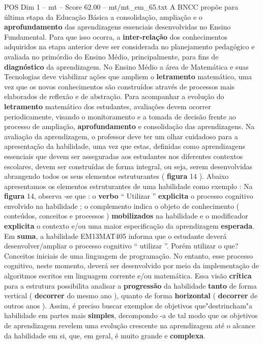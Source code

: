 \begin{textsample}{POS Dim 1 – mt – Score 62.00 – mt/mt\_em\_65.txt}
A BNCC propõe para última etapa da Educação Básica a consolidação, ampliação e o \textbf{aprofundamento} das aprendizagens essenciais desenvolvidas no Ensino Fundamental.
Para que isso ocorra, a \textbf{inter-relação} dos conhecimentos adquiridos na etapa anterior deve ser considerada no planejamento pedagógico e avaliada no primórdio do Ensino Médio, principalmente, para fins de \textbf{diagnóstico} da aprendizagem.
No Ensino Médio a área de Matemática e suas Tecnologias deve viabilizar ações que ampliem o \textbf{letramento} matemático, uma vez que os novos conhecimentos são construídos através de processos mais elaborados de reflexão e de abstração.
Para acompanhar a evolução do \textbf{letramento} matemático dos estudantes, avaliações devem ocorrer periodicamente, visando o monitoramento e a tomada de decisão frente ao processo de ampliação, \textbf{aprofundamento} e consolidação das aprendizagens.
Na avaliação da aprendizagem, o professor deve ter um olhar cuidadoso para a apresentação da habilidade, uma vez que estas, definidas como aprendizagens essenciais que devem ser asseguradas aos estudantes nos diferentes contextos escolares, devem ser construídas de forma integral, ou seja, serem desenvolvidas abrangendo todos os seus elementos estruturantes ( \textbf{figura} 14 ).
Abaixo apresentamos os elementos estruturantes de uma habilidade como exemplo : Na \textbf{figura} 14, observa -se que : o \textbf{verbo} “ Utilizar ” \textbf{explicita} o processo cognitivo envolvido na habilidade ; o complemento indica o objeto de conhecimento ( conteúdos, conceitos e processos ) \textbf{mobilizados} na habilidade e o modificador \textbf{explicita} o contexto e/ou uma maior especificação da aprendizagem \textbf{esperada}.
Em \textbf{suma}, a habilidade EM13MAT405 informa que o estudante deverá desenvolver/ampliar o processo cognitivo “ utilizar ”.
Porém utilizar o que?
Conceitos iniciais de uma linguagem de programação.
No entanto, esse processo cognitivo, neste momento, deverá ser desenvolvido por meio da implementação de algoritmos escritos em linguagem corrente e/ou matemática.
Essa visão \textbf{crítica} para a estrutura possibilita analisar a \textbf{progressão} da habilidade \textbf{tanto} de forma vertical ( \textbf{decorrer} do mesmo ano ), quanto de forma \textbf{horizontal} ( \textbf{decorrer} de outros anos ).
Assim, é preciso buscar exemplos de objetivos que"destrincham"a habilidade em partes mais \textbf{simples}, decompondo -a de tal modo que os objetivos de aprendizagem revelem uma evolução crescente na aprendizagem até o alcance da habilidade em si, que, em geral, é muito grande e \textbf{complexa}.

\end{textsample}
